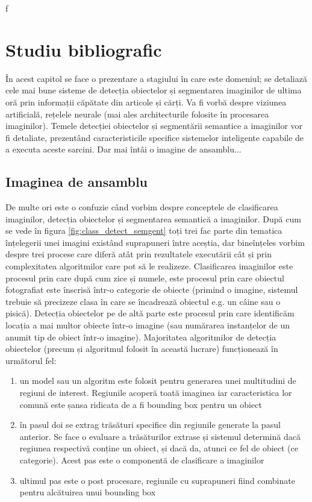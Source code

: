 f%
\chapter{Studiu bibliografic}
\label{cap:studiu-bibliografic}
În acest capitol se face o prezentare a stagiului în care este domeniul; se detaliază cele mai bune sisteme de detecția obiectelor și segmentarea imaginilor de ultima oră prin informații căpătate din articole și cărți.\newline
Va fi vorbă despre viziunea artificială, rețelele neurale (mai ales architecturile folosite în procesarea imaginilor). Temele detecției obiectelor și segmentării semantice a imaginilor vor fi detaliate, prezentând caracteristicile specifice sistemelor inteligente capabile de a executa aceste sarcini. Dar mai întâi o imagine de ansamblu...\newline

\section{Imaginea de ansamblu}
De multe ori este o confuzie când vorbim despre conceptele de clasificarea imaginilor, detecția obiectelor și segmentarea semantică a imaginilor. După cum se vede în figura \ref{fig:class_detect_semgent} toți trei fac parte din tematica înțelegerii unei imagini existând suprapuneri între aceștia, dar bineînțeles vorbim despre trei procese care diferă atât prin rezultatele executării cât și prin complexitatea algoritmilor care pot să le realizeze.\newline
Clasificarea imaginilor este procesul prin care după cum zice și numele, este procesul prin care obiectul fotografiat este înscrisă într-o categorie de obiecte (primind o imagine, sistemul trebuie să precizeze clasa în care se încadrează obiectul e.g. un câine sau o pisică).\newline
Detecția obiectelor pe de altă parte este procesul prin care identificăm locația a mai multor obiecte într-o imagine (sau numărarea instanțelor de un anumit tip de obiect într-o imagine). Majoritatea algoritmilor de detecția obiectelor (precum și algoritmul folosit în această lucrare) funcționează în următorul fel:
\begin{enumerate}
	\item un model sau un algoritm este folosit pentru generarea unei multitudini de regiuni de interest. Regiunile acoperă toată imaginea iar caracteristica lor comună este șansa ridicata de a fi bounding box pentru un obiect
	\item în pasul doi se extrag trăsături specifice din regiunile generate la pasul anterior. Se face o evaluare a trăsăturilor extrase și sistemul determină dacă regiunea respectivă conține un obiect, și dacă da, atunci ce fel de obiect (ce categorie). Acest pas este o componentă de clasificare a imaginilor
	\item ultimul pas este o post procesare, regiunile cu suprapuneri fiind combinate pentru alcătuirea unui bounding box
\end{enumerate}

